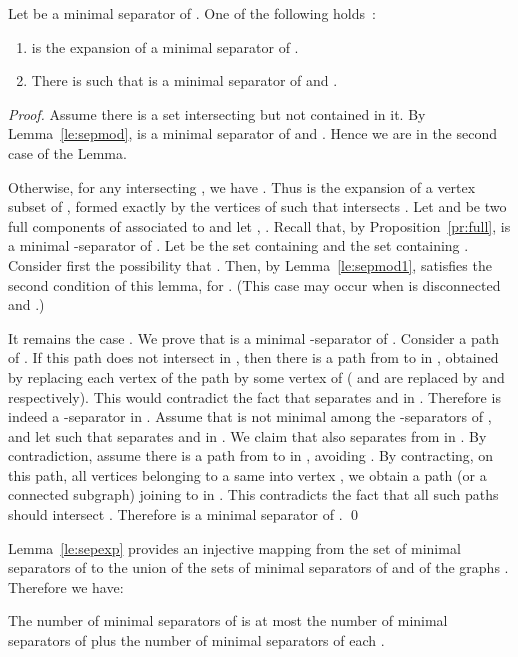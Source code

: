 \documentclass{llncs}
\begin{document}
\begin{lemma}\label{le:sepexp}
Let  be a minimal separator of . One of the following holds~:
\begin{enumerate}
\item  is the expansion of a minimal separator  of . 
\item There is  such that  is a minimal separator of  and .
\end{enumerate}
\end{lemma}
\begin{proof}
Assume there is a set  intersecting  but not contained in it. By Lemma~\ref{le:sepmod},  is a minimal separator of  and . Hence we are in the second case of the Lemma.


Otherwise, for any  intersecting , we have . Thus  is the expansion of a vertex subset  of , formed exactly by the vertices  of  such that  intersects .  Let  and  be two full components of  associated to  and let , . Recall that, by Proposition~\ref{pr:full},  is a minimal -separator of . Let  be the set containing  and  the set containing . Consider first the possibility that . Then, by Lemma~\ref{le:sepmod1},  satisfies the second condition of this lemma, for . (This case may occur when  is disconnected and .)


It remains the case . We prove that  is a minimal -separator of . Consider a  path of . If this path does not intersect  in , then there is a path from  to  in , obtained by replacing each vertex  of the path by some vertex of  ( and  are replaced by  and  respectively). This would contradict the fact that  separates  and  in . Therefore  is indeed a -separator in . Assume that  is not minimal among the -separators of , and let  such that  separates  and  in . We claim that  also separates  from  in . By contradiction, assume there is a path from  to  in , avoiding . By contracting, on this path, all vertices belonging to a same  into vertex , we obtain a path (or a connected subgraph) joining  to  in . This contradicts the fact that all such paths should intersect . Therefore  is a minimal separator of . 
\qed
\end{proof}

Lemma~\ref{le:sepexp} provides an injective mapping from the set of minimal separators of  to the union of the sets of minimal separators of  and of the graphs . Therefore we have:
\begin{corollary}\label{co:sepexp}
The number of minimal separators of  is at most the number of minimal separators of  plus the number of minimal separators of each . 
\end{corollary}
\end{document}
